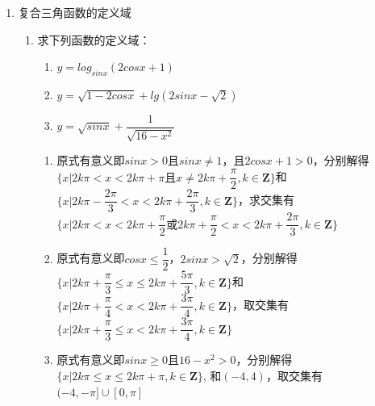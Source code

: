 \begin{enumerate}
\item 复合三角函数的定义域
\begin{enumerate}
    \item 求下列函数的定义域：
    \begin{enumerate}
        \item $y = log_{sinx}(2cosx+1)$
        \item $y = \sqrt{1-2cosx} + lg(2sinx-\sqrt{2})$
        \item $y = \sqrt{sinx} + \dfrac{1}{\sqrt{16 - x^2}}$
    \end{enumerate}
    \begin{jieda}
        \begin{enumerate}
            \item 原式有意义即$sinx > 0$且$sinx \neq 1$，且$2cosx + 1 > 0$，分别解得$\{x| 2k\pi < x < 2k\pi + \pi \mbox{且} x \neq 2k\pi + \dfrac{\pi}{2}, k \in \mathbf{Z} \}$和$\{x | 2k\pi - \dfrac{2\pi}{3} < x < 2k\pi + \dfrac{2\pi}{3}, k \in \mathbf{Z} \}$，求交集有$\{x | 2k\pi < x <  2k\pi + \dfrac{\pi}{2} \mbox{或}  2k\pi + \dfrac{\pi}{2} < x <  2k\pi + \dfrac{2\pi}{3}, k \in \mathbf{Z}\}$
            \item 原式有意义即$cosx \leq \dfrac{1}{2}$，$2sinx > \sqrt{2}$，分别解得$\{x | 2k\pi + \dfrac{\pi}{3} \leq x \leq 2k\pi + \dfrac{5\pi}{3}, k \in \mathbf{Z} \}$和$\{x | 2k\pi + \dfrac{\pi}{4} < x < 2k\pi + \dfrac{3\pi}{4}, k \in \mathbf{Z} \}$，取交集有$\{x | 2k\pi + \dfrac{\pi}{3} \leq x < 2k\pi + \dfrac{3\pi}{4}, k \in \mathbf{Z} \}$
            \item 原式有意义即$sinx \geq 0$且$16 - x^2 > 0$，分别解得$\{x | 2k\pi \leq x \leq 2k\pi + \pi, k \in \mathbf{Z}\}$, 和$(-4, 4)$，取交集有$(-4, -\pi] \cup [0, \pi]$
        \end{enumerate}
    \end{jieda}
\end{enumerate}


\end{enumerate}
